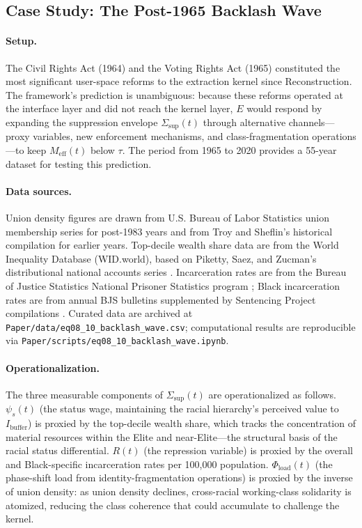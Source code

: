\subsection*{Case Study: The Post-1965 Backlash Wave}
\label{cs:backlash_wave}

\paragraph{Setup.}
The Civil Rights Act (1964) and the Voting Rights Act (1965) constituted the most significant user-space reforms to the extraction kernel since Reconstruction. The framework's prediction is unambiguous: because these reforms operated at the interface layer and did not reach the kernel layer, $E$ would respond by expanding the suppression envelope $\Sigma_{\text{sup}}(t)$ through alternative channels---proxy variables, new enforcement mechanisms, and class-fragmentation operations---to keep $M_{\text{eff}}(t)$ below $\tau$. The period from 1965 to 2020 provides a 55-year dataset for testing this prediction.

\paragraph{Data sources.}
Union density figures are drawn from U.S. Bureau of Labor Statistics union membership series \cite{bls_union_membership} for post-1983 years and from Troy and Sheflin's historical compilation for earlier years. Top-decile wealth share data are from the World Inequality Database (WID.world), based on Piketty, Saez, and Zucman's distributional national accounts series \cite{piketty}. Incarceration rates are from the Bureau of Justice Statistics National Prisoner Statistics program \cite{bjs_prisoners}; Black incarceration rates are from annual BJS bulletins supplemented by Sentencing Project compilations \cite{sentencing_project}. Curated data are archived at \texttt{Paper/data/eq08\_10\_backlash\_wave.csv}; computational results are reproducible via \texttt{Paper/scripts/eq08\_10\_backlash\_wave.ipynb}.

\paragraph{Operationalization.}
The three measurable components of $\Sigma_{\text{sup}}(t)$ are operationalized as follows. $\psi_s(t)$ (the status wage, maintaining the racial hierarchy's perceived value to $I_{\text{buffer}}$) is proxied by the top-decile wealth share, which tracks the concentration of material resources within the Elite and near-Elite---the structural basis of the racial status differential. $R(t)$ (the repression variable) is proxied by the overall and Black-specific incarceration rates per 100,000 population. $\Phi_{\text{load}}(t)$ (the phase-shift load from identity-fragmentation operations) is proxied by the inverse of union density: as union density declines, cross-racial working-class solidarity is atomized, reducing the class coherence that could accumulate to challenge the kernel.

